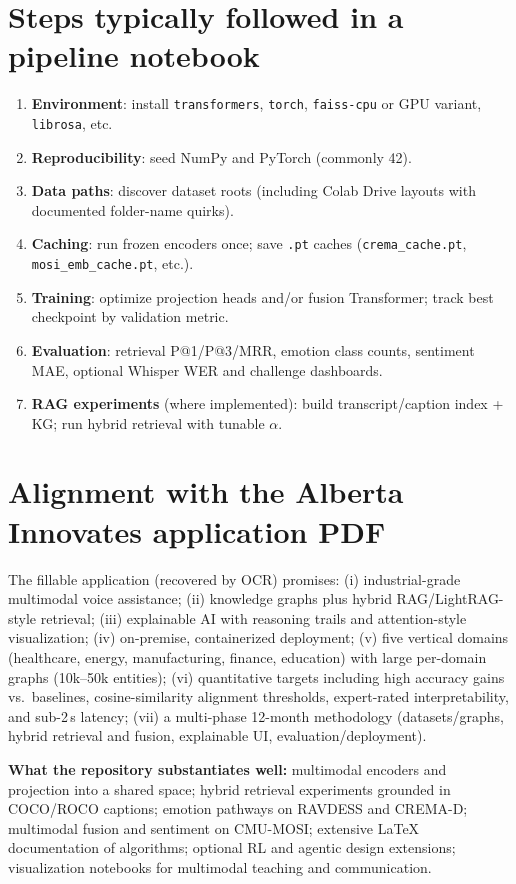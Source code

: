 \documentclass[11pt,a4paper]{article}
\begin{document}
\section{Steps typically followed in a pipeline notebook}
\begin{enumerate}[leftmargin=1.5em]
  \item \textbf{Environment}: install \texttt{transformers}, \texttt{torch}, \texttt{faiss-cpu} or GPU variant, \texttt{librosa}, etc.
  \item \textbf{Reproducibility}: seed NumPy and PyTorch (commonly 42).
  \item \textbf{Data paths}: discover dataset roots (including Colab Drive layouts with documented folder-name quirks).
  \item \textbf{Caching}: run frozen encoders once; save \texttt{.pt} caches (\texttt{crema\_cache.pt}, \texttt{mosi\_emb\_cache.pt}, etc.).
  \item \textbf{Training}: optimize projection heads and/or fusion Transformer; track best checkpoint by validation metric.
  \item \textbf{Evaluation}: retrieval P@1/P@3/MRR, emotion class counts, sentiment MAE, optional Whisper WER and challenge dashboards.
  \item \textbf{RAG experiments} (where implemented): build transcript/caption index + KG; run hybrid retrieval with tunable $\alpha$.
\end{enumerate}

\section{Alignment with the Alberta Innovates application PDF}
The fillable application (recovered by OCR) promises: (i) industrial-grade multimodal voice assistance; (ii) knowledge graphs plus hybrid RAG/LightRAG-style retrieval; (iii) explainable AI with reasoning trails and attention-style visualization; (iv) on-premise, containerized deployment; (v) five vertical domains (healthcare, energy, manufacturing, finance, education) with large per-domain graphs (10k--50k entities); (vi) quantitative targets including high accuracy gains vs.\ baselines, cosine-similarity alignment thresholds, expert-rated interpretability, and sub-2\,s latency; (vii) a multi-phase 12-month methodology (datasets/graphs, hybrid retrieval and fusion, explainable UI, evaluation/deployment).

\textbf{What the repository substantiates well:} multimodal encoders and projection into a shared space; hybrid retrieval experiments grounded in COCO/ROCO captions; emotion pathways on RAVDESS and CREMA-D; multimodal fusion and sentiment on CMU-MOSI; extensive \LaTeX{} documentation of algorithms; optional RL and agentic design extensions; visualization notebooks for multimodal teaching and communication.
\end{document}
